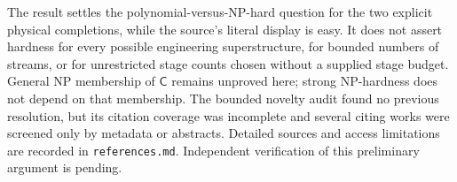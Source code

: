 \documentclass[11pt,a4paper]{report}
\newcommand{\CC}{\mathsf{C}}
\begin{document}
The result settles the polynomial-versus-NP-hard question for the two
explicit physical completions, while the source's literal display is easy.
It does not assert hardness for every possible engineering superstructure,
for bounded numbers of streams, or for unrestricted stage counts chosen
without a supplied stage budget. General NP membership of $\CC$ remains
unproved here; strong NP-hardness does not depend on that membership.
The bounded novelty audit found no previous resolution, but its citation
coverage was incomplete and several citing works were screened only by
metadata or abstracts. Detailed sources and access limitations are recorded
in \texttt{references.md}. Independent verification of this preliminary
argument is pending.
\paperreferences
\end{document}
